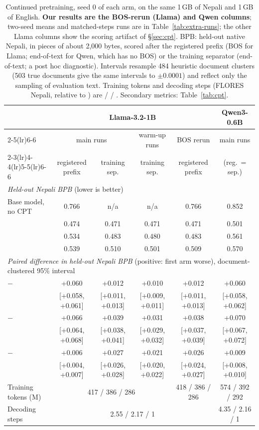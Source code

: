 \begin{table}[t]
\centering\small
\setlength{\tabcolsep}{4.5pt}
\begin{tabular}{lccccc}
\toprule
 & \multicolumn{4}{c}{Llama-3.2-1B} & Qwen3-0.6B \\
\cmidrule(lr){2-5}\cmidrule(lr){6-6}
 & \multicolumn{2}{c}{main runs} & warm-up runs & BOS rerun & main runs \\
\cmidrule(lr){2-3}\cmidrule(lr){4-4}\cmidrule(lr){5-5}\cmidrule(lr){6-6}
 & registered prefix & training sep. & training sep. & registered prefix & (reg.\ = sep.) \\
\midrule
\multicolumn{6}{l}{\emph{Held-out Nepali BPB} (lower is better)} \\
Base model, no CPT & 0.766 & n/a & n/a & 0.766 & 0.852 \\
\RO{} & 0.474 & 0.471 & 0.471 & 0.471 & 0.501 \\
\RI{} & 0.534 & 0.483 & 0.480 & 0.483 & 0.561 \\
\RII{} & 0.539 & 0.510 & 0.501 & 0.509 & 0.570 \\
\midrule
\multicolumn{6}{l}{\emph{Paired difference in held-out Nepali BPB} (positive: first arm worse), document-clustered 95\% interval} \\
\RI{} $-$ \RO{} & +0.060 & +0.012 & +0.010 & +0.012 & +0.060 \\
 & [+0.058, +0.061] & [+0.011, +0.013] & [+0.009, +0.011] & [+0.011, +0.013] & [+0.058, +0.062] \\[2pt]
\RII{} $-$ \RO{} & +0.066 & +0.039 & +0.031 & +0.038 & +0.070 \\
 & [+0.064, +0.068] & [+0.038, +0.041] & [+0.029, +0.032] & [+0.037, +0.039] & [+0.067, +0.072] \\[2pt]
\RII{} $-$ \RI{} & +0.006 & +0.027 & +0.021 & +0.026 & +0.009 \\
 & [+0.004, +0.007] & [+0.026, +0.028] & [+0.020, +0.022] & [+0.024, +0.027] & [+0.008, +0.010] \\
\midrule
Training tokens (M) & \multicolumn{3}{c}{417 / 386 / 286} & 418 / 386 / 286 & 574 / 392 / 292 \\
Decoding steps & \multicolumn{4}{c}{2.55 / 2.17 / 1} & 4.35 / 2.16 / 1 \\
\bottomrule
\end{tabular}
\caption{Continued pretraining, seed 0 of each arm, on the same 1\,GB of Nepali and 1\,GB of English. \textbf{Our results are the BOS-rerun (Llama) and Qwen columns}; two-seed means and matched-steps runs are in Table~\ref{tab:extra-runs}; the other Llama columns show the scoring artifact of \S\ref{sec:cpt}. BPB: held-out native Nepali, in pieces of about 2{,}000 bytes, scored after the registered prefix (BOS for Llama; end-of-text for Qwen, which has no BOS) or the training separator (end-of-text; a post hoc diagnostic). Intervals resample 484 heuristic document clusters (503 true documents give the same intervals to $\pm0.0001$) and reflect only the sampling of evaluation text. Training tokens and decoding steps (FLORES Nepali, relative to \RII{}) are \RO{} / \RI{} / \RII{}. Secondary metrics: Table~\ref{tab:cpt}.}
\label{tab:prefix}
\end{table}
